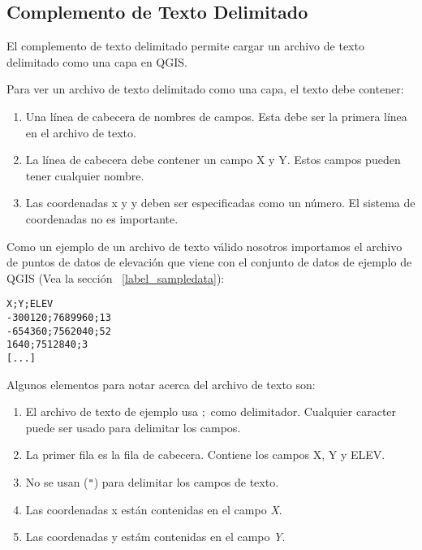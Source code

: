 
\subsection{Complemento de Texto Delimitado}\label{label_dltext}    


El complemento de texto delimitado permite cargar un archivo de texto delimitado como una capa en QGIS. 


Para ver un archivo de texto delimitado como una capa, el texto debe contener:

\begin{enumerate}      
\item Una línea de cabecera de nombres de campos. Esta debe ser la primera línea en el archivo de texto.
\item La línea de cabecera debe contener un campo X y Y. Estos campos pueden tener cualquier nombre.
\item Las coordenadas x y y deben ser especificadas como un número. El sistema de coordenadas no es importante.
\end{enumerate}

Como un ejemplo de un archivo de texto válido nosotros importamos el archivo de puntos de datos de elevación 
 que viene con el conjunto de datos de ejemplo de QGIS (Vea la sección ~\ref{label_sampledata}):

\begin{verbatim} 
X;Y;ELEV
-300120;7689960;13
-654360;7562040;52
1640;7512840;3
[...]
\end{verbatim}

Algunos elementos para notar acerca del archivo de texto son:

\begin{enumerate}
\item El archivo de texto de ejemplo usa \mbox{$;$} como delimitador. Cualquier caracter puede ser usado para delimitar los campos.
\item La primer fila es la fila de cabecera. Contiene los campos X, Y y ELEV.
\item No se usan ({\tt{}"{}}) para delimitar los campos de texto.
\item Las coordenadas x están contenidas en el campo {\em X}.
\item Las coordenadas y estám contenidas en el campo {\em Y}.
\end{enumerate}


